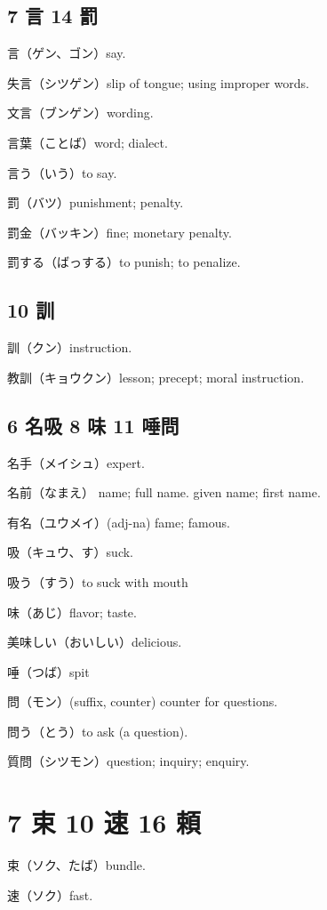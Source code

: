 \subsection{7 言 14 罰}

言（ゲン、ゴン）say.

失言（シツゲン）slip of tongue; using improper words.

文言（ブンゲン）wording.

言葉（ことば）word; dialect.

言う（いう）to say.

罰（バツ）punishment; penalty.

罰金（バッキン）fine; monetary penalty.

罰する（ばっする）to punish; to penalize.

\subsection{10 訓}

訓（クン）instruction.

教訓（キョウクン）lesson; precept; moral instruction.

\subsection{6 名吸 8 味 11 唾問}

名手（メイシュ）expert.

名前（なまえ）
name; full name.
given name; first name.

有名（ユウメイ）(adj-na) fame; famous.

吸（キュウ、す）suck.

吸う（すう）to suck with mouth

味（あじ）flavor; taste.

美味しい（おいしい）delicious.

唾（つば）spit

問（モン）(suffix, counter) counter for questions.

問う（とう）to ask (a question).

質問（シツモン）question; inquiry; enquiry.

\section{7 束 10 速 16 頼}

束（ソク、たば）bundle.

速（ソク）fast.

